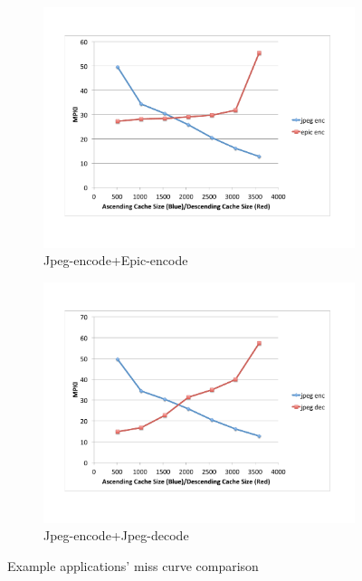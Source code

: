 \documentclass{acm_proc_article-sp}
\begin{document}
\begin{figure}
\begin{subfigure}[b]{0.22\textwidth}
    \includegraphics[width=\textwidth]{figs/jpeg-encode+epic-encode.pdf}
    \caption{Jpeg-encode+Epic-encode}
    \label{fig:jpeg-decode-epic-encode}
  \end{subfigure}
  \begin{subfigure}[b]{0.22\textwidth}
    \includegraphics[width=\textwidth]{figs/jpeg-encode+jpeg-decode.pdf}
    \caption{Jpeg-encode+Jpeg-decode}
    \label{fig:jpeg-encode-jpeg-decode}
  \end{subfigure}
  \caption{Example applications' miss curve comparison}

  \label{fig:miss-curve-comp}
\end{figure}
\end{document}
